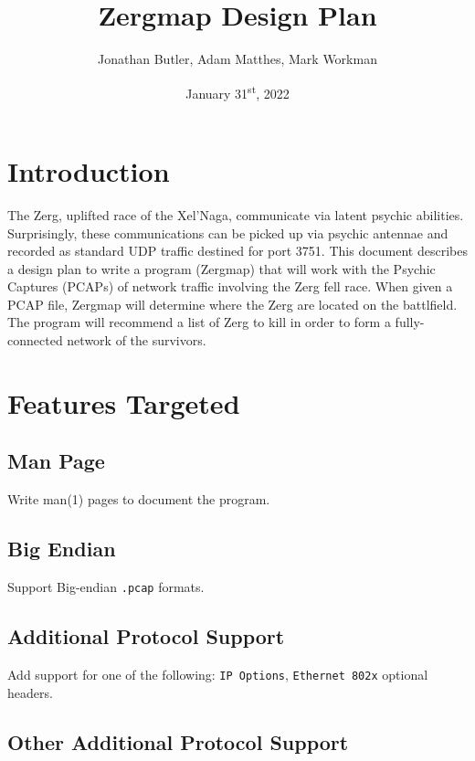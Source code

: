 \documentclass[12pt]{article}
\title{Zergmap Design Plan}
\author{Jonathan Butler, Adam Matthes, Mark Workman}
\date{January 31\textsuperscript{st}, 2022}
\begin{document}
\maketitle
\section{Introduction}

The Zerg, uplifted race of the Xel’Naga, communicate via latent psychic abilities. Surprisingly, these communications can be picked up via psychic antennae and recorded as standard UDP traffic destined for port 3751.
\newline
\newline
This document describes a design plan to write a program (Zergmap) that will work with the Psychic Captures (PCAPs) of network traffic involving the Zerg fell race. When given a PCAP file, Zergmap will determine where the Zerg are located on the battlfield. The program will recommend a list of Zerg to kill in order to form a fully-connected network of the survivors.

\section{Features Targeted}

\subsection{Man Page}

Write man(1) pages to document the program.

\subsection{Big Endian}

Support Big-endian \lstinline|.pcap| formats.

\subsection{Additional Protocol Support}

Add support for one of the following: \lstinline|IP Options|, \lstinline|Ethernet 802x| optional headers.

\subsection{Other Additional Protocol Support }
\end{document}
